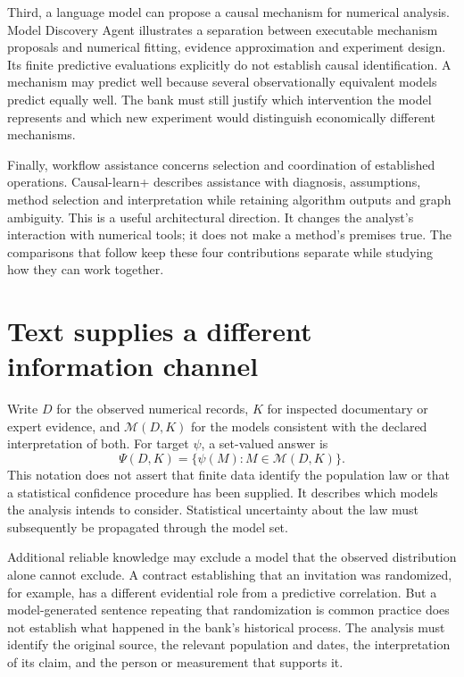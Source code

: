 Third, a language model can propose a causal mechanism for numerical analysis.
Model Discovery Agent illustrates a separation between executable mechanism
proposals and numerical fitting, evidence approximation and experiment design.
Its finite predictive evaluations explicitly do not establish causal
identification. \citep{v12_la_2608_09696} A mechanism may predict well because
several observationally equivalent models predict equally well. The bank must
still justify which intervention the model represents and which new experiment
would distinguish economically different mechanisms.

Finally, workflow assistance concerns selection and coordination of established
operations. Causal-learn+ describes assistance with diagnosis, assumptions,
method selection and interpretation while retaining algorithm outputs and
graph ambiguity. \citep{v12_la_2606_23608} This is a useful architectural direction.
It changes the analyst's interaction with numerical tools; it does not make a
method's premises true. The comparisons that follow keep these four contributions
separate while studying how they can work together.

\section{Text supplies a different information channel}

Write $D$ for the observed numerical records, $K$ for inspected documentary or
expert evidence, and $\mathcal M(D,K)$ for the models consistent with the
declared interpretation of both. For target $\psi$, a set-valued answer is
\[
 \Psi(D,K)=\{\psi(M):M\in\mathcal M(D,K)\}.
\]
This notation does not assert that finite data identify the population law or
that a statistical confidence procedure has been supplied. It describes which
models the analysis intends to consider. Statistical uncertainty about the law
must subsequently be propagated through the model set.

Additional reliable knowledge may exclude a model that the observed distribution
alone cannot exclude. A contract establishing that an invitation was randomized,
for example, has a different evidential role from a predictive correlation.
But a model-generated sentence repeating that randomization is common practice
does not establish what happened in the bank's historical process. The analysis
must identify the original source, the relevant population and dates, the
interpretation of its claim, and the person or measurement that supports it.

